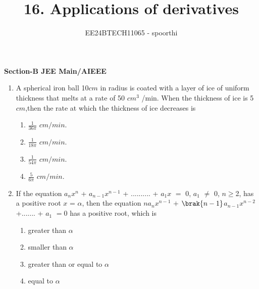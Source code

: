 \documentclass[journal,12pt,onecolumn]{IEEEtran}
\theoremstyle{remark}
\begin{document}



\title{16. Applications of derivatives}
\author{EE24BTECH11065 - spoorthi }
\newpage
\maketitle


\bigskip

\renewcommand{\thefigure}{\theenumi}
\renewcommand{\thetable}{\theenumi}
\begin{large}
\textbf{{Section-B JEE Main/AIEEE}}
\end{large}


\begin{enumerate}



    \item A spherical iron ball 10$cm$ in radius is coated with a layer of ice of uniform thickness that melts at a rate of 50 $cm^3$ /min. When the thickness of ice is 5$cm$,then the rate at which the thickness of ice decreases is\hfill{}
    \begin{multicols}{4}
    \begin{enumerate}
        \item 
        $\frac{1}{36\pi}$ $cm/min$. 
        \item $\frac{1}{18\pi}$ $cm/min$. 
        \item $\frac{1}{54\pi}$ $cm/min$. 
        \item $\frac{5}{6\pi}$  $cm/min$. 
        
    \end{enumerate}
    \end{multicols}

    
    \item If the equation $a_nx^n$ + $a$$_{n-1}x^{n-1}$ + .......... + $a_1$$x$ $=$ 0, $a_1$ $\ne$ 0, $n$$\geq$2, has a positive root $x$ = $\alpha$, then the equation $n$$a_n$$x^{n-1}$  $+$ $\brak{n-1}$$a_{n-1}$$x^{n-2}$ +....... + $a_1$ $=$0 has a positive root, which is 
    \hfill{}
     
    \begin{enumerate}
    
        
    
    
        \item greater than $\alpha$
        \item smaller than $\alpha$
        \item greater than or equal to $\alpha$
        \item equal to $\alpha$
        

\end{enumerate}
\end{enumerate}
\end{document}
